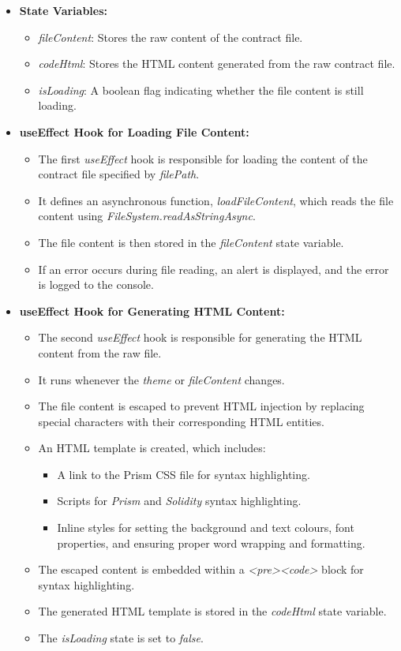 \begin{itemize}
    \item \textbf{State Variables:}
    \begin{itemize}
        \item \textit{fileContent}: Stores the raw content of the contract file.
        \item \textit{codeHtml}: Stores the HTML content generated from the raw contract file.
        \item \textit{isLoading}: A boolean flag indicating whether the file content is still loading.
    \end{itemize}

    \item \textbf{useEffect Hook for Loading File Content:}
    \begin{itemize}
        \item The first \textit{useEffect} hook is responsible for loading the content of the contract file specified by \textit{filePath}.
        \item It defines an asynchronous function, \textit{loadFileContent}, which reads the file content using \textit{FileSystem.readAsStringAsync}.
        \item The file content is then stored in the \textit{fileContent} state variable.
        \item If an error occurs during file reading, an alert is displayed, and the error is logged to the console.
    \end{itemize}

    \item \textbf{useEffect Hook for Generating HTML Content:}
    \begin{itemize}
        \item The second \textit{useEffect} hook is responsible for generating the HTML content from the raw file.
        \item It runs whenever the \textit{theme} or \textit{fileContent} changes.
        \item The file content is escaped to prevent HTML injection by replacing special characters with their corresponding HTML entities.
        \item An HTML template is created, which includes:
        \begin{itemize}
            \item A link to the Prism CSS file for syntax highlighting.
            \item Scripts for \textit{Prism} and \textit{Solidity} syntax highlighting.
            \item Inline styles for setting the background and text colours, font properties, and ensuring proper word wrapping and formatting.
        \end{itemize}
        \item The escaped content is embedded within a \textit{<pre><code>} block for syntax highlighting.
        \item The generated HTML template is stored in the \textit{codeHtml} state variable.
        \item The \textit{isLoading} state is set to \textit{false}.
    \end{itemize}


\end{itemize}
